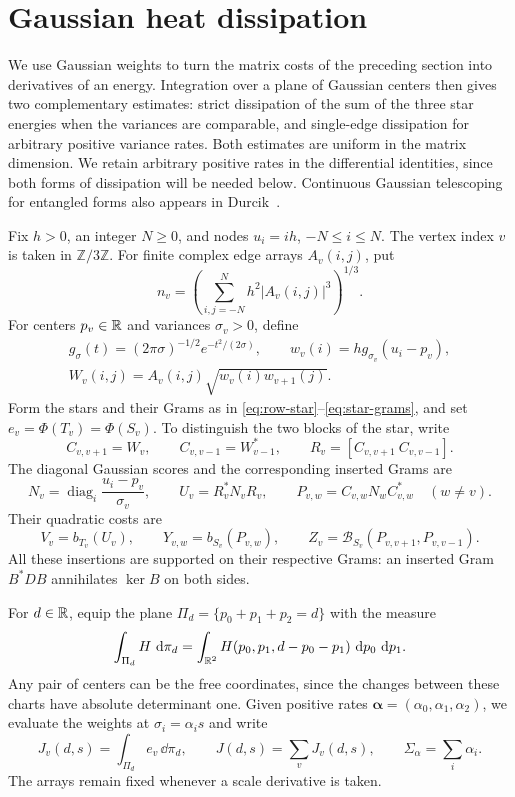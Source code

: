 \section{Gaussian heat dissipation}\label{sec:heat}

We use Gaussian weights to turn the matrix costs of the preceding section
into derivatives of an energy.  Integration over a plane of Gaussian
centers then gives two complementary estimates: strict dissipation of the
sum of the three star energies when the variances are comparable, and
single-edge dissipation for arbitrary positive variance rates.  Both
estimates are uniform in the matrix dimension.  We retain arbitrary
positive rates in the differential identities, since both forms of
dissipation will be needed below.  Continuous Gaussian
telescoping for entangled forms also appears in
Durcik~\cite[Lemma~3 and Section~3]{Durcik2015}.

Fix $h>0$, an integer $N\ge0$, and nodes $u_i=ih$, $-N\le i\le N$.
The vertex index $v$ is taken in $\mathbb Z/3\mathbb Z$.
For finite complex edge arrays $A_v(i,j)$, put
\[
 n_v=\left(\sum_{i,j=-N}^N h^2|A_v(i,j)|^3\right)^{1/3}.
\]
For centers $p_v\in\mathbb R$ and variances $\sigma_v>0$, define
\begin{equation}\label{eq:weights}
 \begin{gathered}
 g_\sigma(t)=(2\pi\sigma)^{-1/2}e^{-t^2/(2\sigma)},
 \qquad w_v(i)=h g_{\sigma_v}(u_i-p_v),\\
 W_v(i,j)=A_v(i,j)\sqrt{w_v(i)w_{v+1}(j)}.
 \end{gathered}
\end{equation}
Form the stars and their Grams as in
\eqref{eq:row-star}--\eqref{eq:star-grams}, and set
$e_v=\Phi(T_v)=\Phi(S_v)$.
To distinguish the two blocks of the star, write
\[
 C_{v,v+1}=W_v,\qquad C_{v,v-1}=W_{v-1}^*,
 \qquad R_v=[C_{v,v+1}\ C_{v,v-1}].
\]
The diagonal Gaussian scores and the corresponding inserted Grams are
\[
 N_v=\operatorname{diag}_i\frac{u_i-p_v}{\sigma_v},\qquad
 U_v=R_v^*N_vR_v,\qquad
 P_{v,w}=C_{v,w}N_wC_{v,w}^*\quad(w\ne v).
\]
Their quadratic costs are
\begin{equation}\label{eq:heat-costs}
 V_v=b_{T_v}(U_v),\qquad
 Y_{v,w}=b_{S_v}(P_{v,w}),\qquad
 Z_v=\mathcal B_{S_v}(P_{v,v+1},P_{v,v-1}).
\end{equation}
All these insertions are supported on their respective Grams: an
inserted Gram $B^*DB$ annihilates $\ker B$ on both sides.

For $d\in\mathbb R$, equip the plane
$\Pi_d=\{p_0+p_1+p_2=d\}$ with the measure
\begin{equation}\label{eq:heat-plane-measure}
 \int_{\Pi_d}H\,\,\mathrm d\pi_d
 =\int_{\mathbb R^2}H(p_0,p_1,d-p_0-p_1)\,\,\mathrm d p_0\,\,\mathrm d p_1.
\end{equation}
Any pair of centers can be the free coordinates, since the changes
between these charts have absolute determinant one.
Given positive rates $\boldsymbol\alpha=(\alpha_0,\alpha_1,\alpha_2)$,
we evaluate the weights at $\sigma_i=\alpha_i s$ and write
\[
 J_v(d,s)=\int_{\Pi_d}e_v\,\dd\pi_d,
 \qquad J(d,s)=\sum_vJ_v(d,s),
 \qquad \Sigma_\alpha=\sum_i\alpha_i.
\]
The arrays remain fixed whenever a scale derivative is taken.

